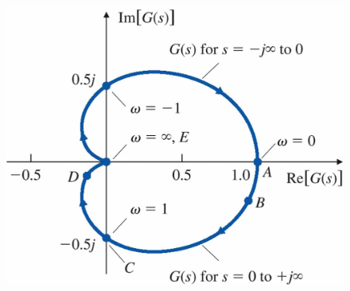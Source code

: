\begin{tcolorbox}[colback=white!10!white,
                  colframe=blue!50!white,
                  title=Konstruktionsregeln Nyquist-Diagramm]
\begin{figure}[H]
\begin{subfigure}{0.5\linewidth}
    \end{subfigure}
    \begin{minipage}{0.45\linewidth}
        \includegraphics[width=\linewidth]{images/nyquist3}
    \end{minipage}
\end{figure}
\end{tcolorbox}

